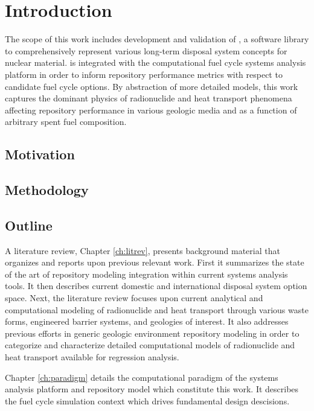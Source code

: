 \chapter{Introduction}\label{ch:introduction}


The scope of this work includes development and validation of \Cyder, a software 
library to comprehensively represent various long-term disposal system concepts 
for nuclear material. \Cyder is integrated with the \Cyclus 
computational fuel cycle systems analysis platform in order to inform 
repository performance metrics with respect to candidate fuel cycle options.  
By abstraction of more detailed models, this work captures the dominant physics 
of radionuclide and heat transport phenomena affecting repository performance 
in various geologic media and as a function of arbitrary spent fuel 
composition. 

\section{Motivation} 


\section{Methodology} 

\section{Outline}

A literature review, Chapter \ref{ch:litrev}, presents background material that organizes and 
reports upon previous relevant work. First it summarizes the state of the art of 
repository modeling integration within current systems analysis tools. It then 
describes current domestic and international disposal system option space. 
Next, the literature review focuses upon current analytical and 
computational modeling of radionuclide and heat transport through various waste 
forms, engineered barrier systems, and geologies of interest.  It also 
addresses previous efforts in generic geologic environment repository modeling in order to 
categorize and characterize detailed computational models of radionuclide and 
heat transport available for regression analysis.


Chapter \ref{ch:paradigm} details the computational paradigm of the \Cyclus 
systems analysis platform and \Cyder repository model which constitute this work. 
It describes the \Cyclus fuel cycle simulation context which drives fundamental 
\Cyder design descisions. 

